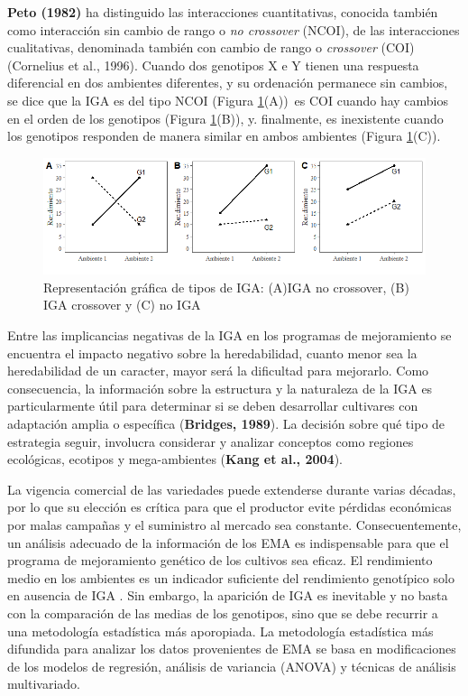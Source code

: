 \textbf{Peto (1982)} ha distinguido las interacciones cuantitativas, conocida también como interacción sin cambio de rango o \emph{no crossover} (NCOI), de las interacciones cualitativas, denominada también con
cambio de rango o \emph{crossover} (COI) (Cornelius et al., 1996). Cuando dos genotipos X e Y tienen una respuesta diferencial en dos ambientes diferentes, y su ordenación permanece sin cambios, se dice que la IGA es del tipo NCOI (Figura \ref{fig:fig11}(A))\, es COI cuando hay cambios en el orden de los genotipos (Figura  \ref{fig:fig11}(B)), y. finalmente, es inexistente cuando los genotipos responden de manera similar en ambos ambientes (Figura \ref{fig:fig11}(C)). 


\begin{figure}[h]
\begin{center}
\includegraphics[width=14cm]{./Graficos/interac}
\end{center}
\caption{Representación gráfica de tipos de IGA: (A)IGA no crossover, (B) IGA crossover y (C) no IGA}
\label{fig:fig11}
\end{figure}


Entre las implicancias negativas de la IGA en los programas de mejoramiento se encuentra el impacto negativo sobre la heredabilidad, cuanto menor sea la heredabilidad de un caracter, mayor será la dificultad para mejorarlo. Como consecuencia, la información sobre la estructura y la naturaleza de la IGA es particularmente útil para determinar si se deben desarrollar cultivares con adaptación amplia o específica (\textbf{Bridges, 1989}). La decisión sobre qué tipo de estrategia seguir, involucra considerar y analizar  conceptos como regiones ecológicas, ecotipos y mega-ambientes (\textbf{Kang et al., 2004}).


La vigencia comercial de las variedades puede extenderse durante varias décadas, por lo que su elección es crítica para que el productor evite pérdidas económicas por malas campañas y el suministro al mercado sea constante. Consecuentemente, un análisis adecuado de la información de los EMA es indispensable para que el programa de mejoramiento genético de los cultivos sea eficaz. El rendimiento medio en los ambientes es un indicador suficiente del rendimiento genotípico solo en ausencia de IGA \citep{YanKang2003}. Sin embargo, la aparición de IGA es inevitable y no basta con la comparación de las medias de los genotipos, sino que se debe recurrir a una metodología estadística más aporopiada. La metodología estadística más difundida para analizar los datos provenientes de EMA se basa en modificaciones de los modelos de regresión, análisis de variancia (ANOVA) y técnicas de análisis multivariado. 

